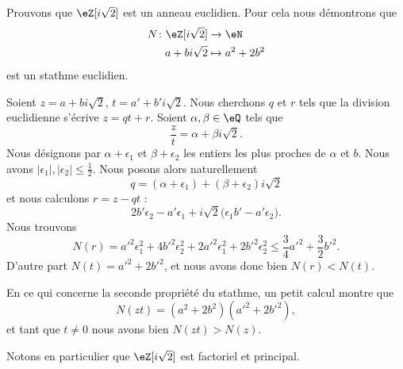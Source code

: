 \begin{example} \label{ExeDufyZI}
    Prouvons que \( \eZ[i\sqrt{2}]\) est un anneau euclidien. Pour cela nous démontrons que
    \begin{equation}    \label{EqOZUIooZGmHWl}
        \begin{aligned}
            N\colon \eZ[i\sqrt{2}]&\to \eN \\
            a+bi\sqrt{2}&\mapsto a^2+2b^2
        \end{aligned}
    \end{equation}
    est un stathme euclidien.

    Soient \( z=a+bi\sqrt{2}\), \( t=a'+b'i\sqrt{2}\). Nous cherchons \( q\) et \( r\) tels que la division euclidienne s'écrive \( z=qt+r\). Soient \( \alpha,\beta\in \eQ\) tels que
    \begin{equation}
        \frac{ z }{ t }=\alpha+\beta i\sqrt{2}.
    \end{equation}
    Nous désignons par \( \alpha+\epsilon_1\) et \( \beta+\epsilon_2\) les entiers les plus proches de \( \alpha\) et \( b\). Nous avons \( | \epsilon_1 |,| \epsilon_2 |\leq \frac{ 1 }{2}\). Nous posons alors naturellement
    \begin{equation}
        q=(\alpha+\epsilon_1)+(\beta+\epsilon_2)i\sqrt{2}
    \end{equation}
    et nous calculons \( r=z-qt\) :
    \begin{equation}
        2b'\epsilon_2-a'\epsilon_1+i\sqrt{2}\big( \epsilon_1b'-a'\epsilon_2 \big).
    \end{equation}
    Nous trouvons
    \begin{equation}
        N(r)=a'^2\epsilon_1^2+4b'^2\epsilon_2^2+2a'^2\epsilon_1^2+2b'^2\epsilon_2^2\leq \frac{ 3 }{ 4 }a'^2+\frac{ 3 }{2}b'^2.
    \end{equation}
    D'autre part \( N(t)=a'^2+2b'^2\), et nous avons donc bien \( N(r)<N(t)\).

    En ce qui concerne la seconde propriété du stathme, un petit calcul montre que
    \begin{equation}
        N(zt)=(a^2+2b^2)(a'^2+2b'^2),
    \end{equation}
    et tant que \( t\neq 0\) nous avons bien \( N(zt)>N(z)\).
\end{example}

Notons en particulier que \( \eZ[i\sqrt{2}]\) est factoriel et principal.

